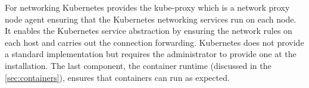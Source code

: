 For networking Kubernetes provides the kube-proxy which is a network proxy node agent ensuring that the Kubernetes networking services run on each node. It enables the Kubernetes service abstraction by ensuring the network rules on each host and carries out the connection forwarding. Kubernetes does not provide a standard implementation but requires the administrator to provide one at the installation. The last component, the container runtime (discussed in the \cref{sec:containers}), ensures that containers can run as expected.




